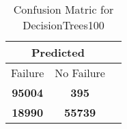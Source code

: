 \begin{table}[] 
\caption{Confusion Matric for DecisionTrees100} 
\label{Table: Prediction Accuracy-DMDDecisionTrees100OnlySunEKF-ignoreReflectionEKF-top2perfectNoFailurePrediction-Reflection} 
\centering 
\begin{tabular} 
 {@{}ccc@{}} 
\toprule 
\multicolumn{2}{c}{\textbf{Predicted}}
 \\ \midrule 
\multicolumn{1}{|c|}{Failure} & 
\multicolumn{1}{c|}{No Failure}
 \\ \midrule 
\multicolumn{1}{|c|}{\color{green}\textbf{95004}} & 
\multicolumn{1}{c|}{\color{red}\textbf{395}}
 \\ \midrule 
\multicolumn{1}{|c|}{\color{red}\textbf{18990}} & 
\multicolumn{1}{c|}{\color{green}\textbf{55739}}
 \\ \bottomrule 
\end{tabular} 
\end{table} 
